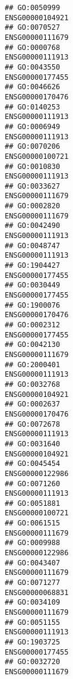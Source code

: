 \documentclass[
]{article}
\begin{document}
\begin{verbatim}
## GO:0050999                                                 ENSG00000104921
## GO:0070527                                                 ENSG00000111679
## GO:0000768                                                 ENSG00000111913
## GO:0043550                                                 ENSG00000177455
## GO:0046626                                                 ENSG00000170476
## GO:0140253                                                 ENSG00000111913
## GO:0006949                                                 ENSG00000111913
## GO:0070206                                                 ENSG00000100721
## GO:0010830                                                 ENSG00000111913
## GO:0033627                                                 ENSG00000111679
## GO:0002820                                                 ENSG00000111679
## GO:0042490                                                 ENSG00000111913
## GO:0048747                                                 ENSG00000111913
## GO:1904427                                                 ENSG00000177455
## GO:0030449                                                 ENSG00000177455
## GO:1900076                                                 ENSG00000170476
## GO:0002312                                                 ENSG00000177455
## GO:0042130                                                 ENSG00000111679
## GO:2000401                                                 ENSG00000111913
## GO:0032768                                                 ENSG00000104921
## GO:0002637                                                 ENSG00000170476
## GO:0072678                                                 ENSG00000111913
## GO:0031640                                                 ENSG00000104921
## GO:0045454                                                 ENSG00000122986
## GO:0071260                                                 ENSG00000111913
## GO:0051881                                                 ENSG00000100721
## GO:0061515                                                 ENSG00000111679
## GO:0009988                                                 ENSG00000122986
## GO:0043407                                                 ENSG00000111679
## GO:0071277                                                 ENSG00000068831
## GO:0034109                                                 ENSG00000111679
## GO:0051155                                                 ENSG00000111913
## GO:1903725                                                 ENSG00000177455
## GO:0032720                                                 ENSG00000111679

\end{verbatim}
\end{document}
